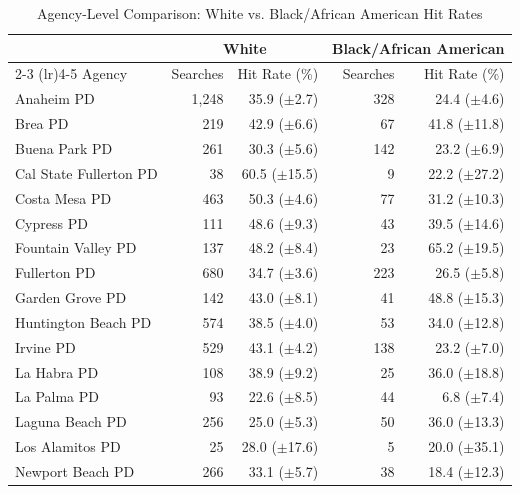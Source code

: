 \begin{table}[H]
\centering
\caption{Agency-Level Comparison: White vs. Black/African American Hit Rates}
\label{tab:agency_hit_rates}
\begin{tabular}{l rr rr}
\toprule
 & \multicolumn{2}{c}{White} & \multicolumn{2}{c}{Black/African American} \\
\cmidrule(lr){2-3} \cmidrule(lr){4-5}
Agency & Searches & Hit Rate (\%) & Searches & Hit Rate (\%) \\
\midrule
Anaheim PD & 1,248 & 35.9 ({\scriptsize $\pm$2.7}) & 328 & 24.4 ({\scriptsize $\pm$4.6}) \\
Brea PD & 219 & 42.9 ({\scriptsize $\pm$6.6}) & 67 & 41.8 ({\scriptsize $\pm$11.8}) \\
Buena Park PD & 261 & 30.3 ({\scriptsize $\pm$5.6}) & 142 & 23.2 ({\scriptsize $\pm$6.9}) \\
Cal State Fullerton PD & 38 & 60.5 ({\scriptsize $\pm$15.5}) & 9 & 22.2 ({\scriptsize $\pm$27.2}) \\
Costa Mesa PD & 463 & 50.3 ({\scriptsize $\pm$4.6}) & 77 & 31.2 ({\scriptsize $\pm$10.3}) \\
Cypress PD & 111 & 48.6 ({\scriptsize $\pm$9.3}) & 43 & 39.5 ({\scriptsize $\pm$14.6}) \\
Fountain Valley PD & 137 & 48.2 ({\scriptsize $\pm$8.4}) & 23 & 65.2 ({\scriptsize $\pm$19.5}) \\
Fullerton PD & 680 & 34.7 ({\scriptsize $\pm$3.6}) & 223 & 26.5 ({\scriptsize $\pm$5.8}) \\
Garden Grove PD & 142 & 43.0 ({\scriptsize $\pm$8.1}) & 41 & 48.8 ({\scriptsize $\pm$15.3}) \\
Huntington Beach PD & 574 & 38.5 ({\scriptsize $\pm$4.0}) & 53 & 34.0 ({\scriptsize $\pm$12.8}) \\
Irvine PD & 529 & 43.1 ({\scriptsize $\pm$4.2}) & 138 & 23.2 ({\scriptsize $\pm$7.0}) \\
La Habra PD & 108 & 38.9 ({\scriptsize $\pm$9.2}) & 25 & 36.0 ({\scriptsize $\pm$18.8}) \\
La Palma PD & 93 & 22.6 ({\scriptsize $\pm$8.5}) & 44 & 6.8 ({\scriptsize $\pm$7.4}) \\
Laguna Beach PD & 256 & 25.0 ({\scriptsize $\pm$5.3}) & 50 & 36.0 ({\scriptsize $\pm$13.3}) \\
Los Alamitos PD & 25 & 28.0 ({\scriptsize $\pm$17.6}) & 5 & 20.0 ({\scriptsize $\pm$35.1}) \\
Newport Beach PD & 266 & 33.1 ({\scriptsize $\pm$5.7}) & 38 & 18.4 ({\scriptsize $\pm$12.3}) \\

\end{tabular}
\end{table}
